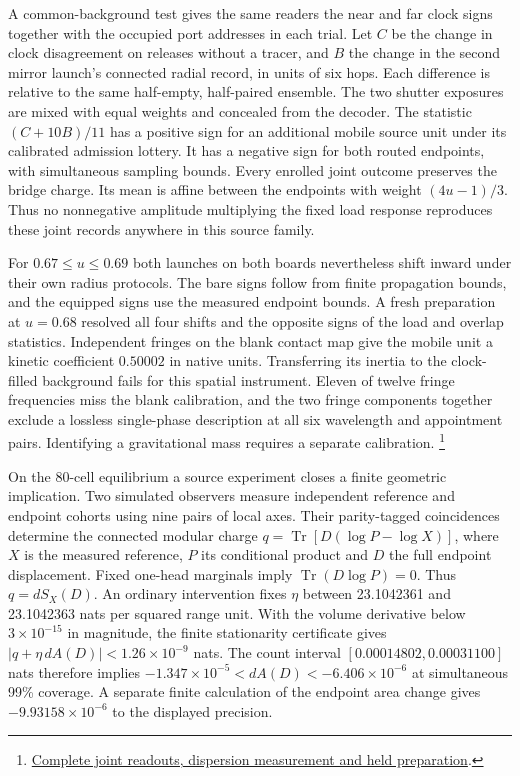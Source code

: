 \documentclass[11pt]{article}
\begin{document}
A common-background test gives the same readers the near and far clock
signs together with the occupied port addresses in each trial. Let $C$
be the change in clock disagreement on releases without a tracer, and
$B$ the change in the second mirror launch's connected radial record,
in units of six hops. Each difference is relative to the same
half-empty, half-paired ensemble. The two shutter exposures are mixed
with equal weights and concealed from the decoder. The statistic
$(C+10B)/11$ has a positive sign for an additional mobile source unit
under its calibrated admission lottery. It has a negative sign for
both routed endpoints, with simultaneous sampling bounds. Every
enrolled joint outcome preserves the bridge charge. Its mean is affine
between the endpoints with weight $(4u-1)/3$. Thus no nonnegative
amplitude multiplying the fixed load response reproduces these
joint records anywhere in this source family.

For $0.67\le u\le0.69$ both launches on both boards nevertheless
shift inward under their own radius protocols. The bare signs follow
from finite propagation bounds, and the equipped signs use the measured
endpoint bounds. A fresh preparation at $u=0.68$ resolved all four
shifts and the opposite signs of the load and overlap statistics.
Independent fringes on the blank contact map give the mobile unit
a kinetic coefficient $0.50002$ in native units. Transferring its
inertia to the clock-filled background fails for this spatial
instrument. Eleven of twelve fringe frequencies miss the blank
calibration, and the two fringe components together exclude a lossless
single-phase description at all six wavelength and appointment pairs.
Identifying a gravitational mass requires a separate calibration.%
\footnote{\href{https://github.com/FloatingPragma/observer-patch-holography/tree/main/model/experiments/interval_echo_shell_flux/product_address/green_response/material_recoil/overlap_source/native_boundary/regional_reference/recovery}{Complete joint readouts, dispersion measurement and held preparation}.}

On the 80-cell equilibrium a source experiment closes a finite
geometric implication. Two simulated observers measure independent
reference and endpoint cohorts using nine pairs of local axes. Their
parity-tagged coincidences determine the connected modular charge
$q=\operatorname{Tr}[D(\log P-\log X)]$, where $X$ is the measured
reference, $P$ its conditional product and $D$ the full endpoint
displacement. Fixed one-head marginals imply $\operatorname{Tr}(D\log P)=0$.
Thus $q=dS_X(D)$. An ordinary intervention fixes $\eta$ between
23.1042361 and 23.1042363 nats per squared range unit. With the
volume derivative below $3\times10^{-15}$ in magnitude, the finite
stationarity certificate gives $|q+\eta\,dA(D)|<1.26\times10^{-9}$ nats.
The count interval $[0.00014802,0.00031100]$ nats therefore implies
$-1.347\times10^{-5}<dA(D)<-6.406\times10^{-6}$ at simultaneous
99\% coverage. A separate finite calculation of the endpoint area
change gives $-9.93158\times10^{-6}$ to the displayed precision.
\end{document}
